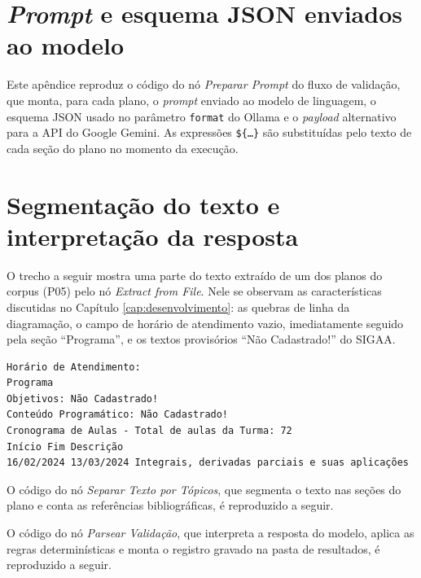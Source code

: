 \begin{apendicesenv}

\chapter{\textit{Prompt} e esquema JSON enviados ao modelo}
\label{ap:prompt}

Este apêndice reproduz o código do nó \textit{Preparar Prompt} do fluxo de validação, que monta, para cada plano, o \textit{prompt} enviado ao modelo de linguagem, o esquema JSON usado no parâmetro \texttt{format} do Ollama e o \textit{payload} alternativo para a API do Google Gemini. As expressões \texttt{\$\{\ldots\}} são substituídas pelo texto de cada seção do plano no momento da execução.



\chapter{Segmentação do texto e interpretação da resposta}
\label{ap:segmentacao}

O trecho a seguir mostra uma parte do texto extraído de um dos planos do corpus (P05) pelo nó \textit{Extract from File}. Nele se observam as características discutidas no Capítulo \ref{cap:desenvolvimento}: as quebras de linha da diagramação, o campo de horário de atendimento vazio, imediatamente seguido pela seção ``Programa'', e os textos provisórios ``Não Cadastrado!'' do SIGAA.

\begin{lstlisting}[numbers=none]
Horário de Atendimento:
Programa
Objetivos: Não Cadastrado!
Conteúdo Programático: Não Cadastrado!
Cronograma de Aulas - Total de aulas da Turma: 72
Início Fim Descrição
16/02/2024 13/03/2024 Integrais, derivadas parciais e suas aplicações
\end{lstlisting}

O código do nó \textit{Separar Texto por Tópicos}, que segmenta o texto nas seções do plano e conta as referências bibliográficas, é reproduzido a seguir.



O código do nó \textit{Parsear Validação}, que interpreta a resposta do modelo, aplica as regras determinísticas e monta o registro gravado na pasta de resultados, é reproduzido a seguir.




\end{apendicesenv}
